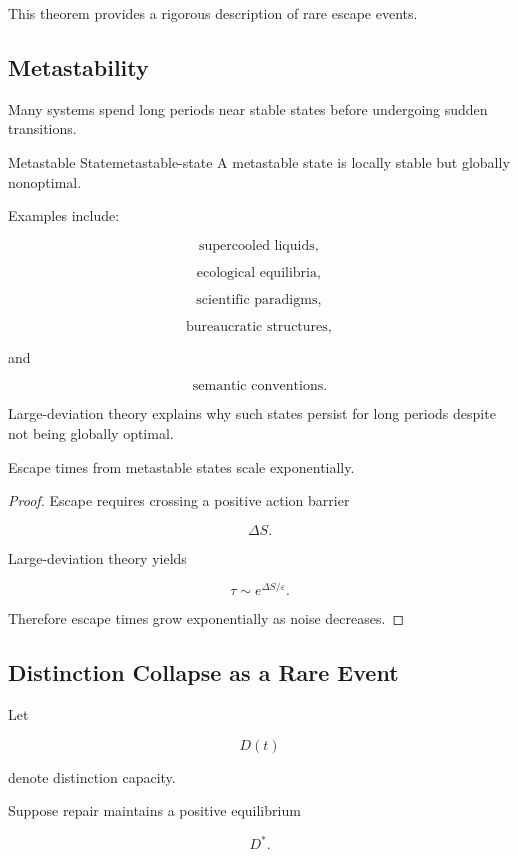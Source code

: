 \documentclass[12pt,twoside,openright]{book}
\newenvironment{prop}
{\begin{proposition}{}{}}
{\end{proposition}}
\begin{document}
This theorem provides a rigorous description of rare
escape events.

\subsection{Metastability}

Many systems spend long periods near stable states before
undergoing sudden transitions.

\begin{definition}{Metastable State}{metastable-state}
A metastable state is locally stable but globally
nonoptimal.
\end{definition}

Examples include:

\[
\text{supercooled liquids},
\]

\[
\text{ecological equilibria},
\]

\[
\text{scientific paradigms},
\]

\[
\text{bureaucratic structures},
\]

and

\[
\text{semantic conventions}.
\]

Large-deviation theory explains why such states persist
for long periods despite not being globally optimal.

\begin{prop}
Escape times from metastable states scale exponentially.
\end{prop}

\begin{proof}
Escape requires crossing a positive action barrier

\[
\Delta S.
\]

Large-deviation theory yields

\[
\tau
\sim
e^{\Delta S/\varepsilon}.
\]

Therefore escape times grow exponentially as noise
decreases.
\end{proof}

\subsection{Distinction Collapse as a Rare Event}

Let

\[
D(t)
\]

denote distinction capacity.

Suppose repair maintains a positive equilibrium

\[
D^*.
\]
\end{document}

